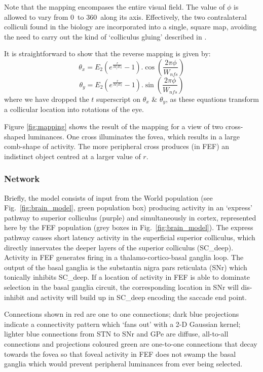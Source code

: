 \documentclass{frontiersSCNS}
\begin{document}
Note that the mapping encompases the entire visual field. The value of
$\phi$ is allowed to vary from 0\dg~to 360\dg~along its axis.
Effectively, the two contralateral colliculi found in the biology are
incorporated into a
single, square map, avoiding the need to carry out the kind of `colliculus
gluing' described in \cite{tabareau_geometry_2007}.

It is straightforward to show that the reverse mapping is given by:
\begin{equation}
   \theta_x = E_2 \left(e^{\frac{r}{M_f E_2}} - 1\right).\cos\left(\frac{2 \pi \phi}{W_{nfs}}\right)
\end{equation}
\begin{equation}
   \theta_y = E_2 \left(e^{\frac{r}{M_f E_2}} - 1\right).\sin\left(\frac{2 \pi \phi}{W_{nfs}}\right)
\end{equation}
where we have dropped the $t$ superscript on $\theta_x$ \& $\theta_y$, as
these equations transform a collicular location into rotations of the eye.

Figure \ref{fig:mapping} shows the result of the mapping for a view of
two cross-shaped luminances. One cross illuminates the fovea, which
results in a large comb-shape of activity. The more peripheral cross
produces (in FEF) an indistinct object centred at a larger value of
$r$.

\subsubsection{Network}

Briefly, the model consists of input from the World population (see
Fig.~\ref{fig:brain_model}, green population box) producing activity
in an `express' pathway to superior colliculus (purple) and
simultaneously in cortex, represented here by the FEF population (grey
boxes in Fig.~\ref{fig:brain_model}). The express pathway causes short
latency activity in the superficial superior colliculus, which
directly innervates the deeper layers of the superior colliculus
(SC\_deep). Activity in FEF generates firing in a
thalamo-cortico-basal ganglia loop. The output of the basal ganglia is
the substantia nigra pars reticulata (SNr) which tonically inhibits
SC\_deep. If a location of activity in FEF is able to dominate
selection in the basal ganglia circuit, the corresponding location in
SNr will dis-inhibit and activity will build up in SC\_deep encoding
the saccade end point.

Connections shown in red are one to one connections; dark blue
projections indicate a connectivity pattern which `fans out' with a
2-D Gaussian kernel; lighter blue connections from STN to SNr and GPe
are diffuse, all-to-all connections and projections coloured green are
one-to-one connections that decay towards the fovea so that foveal
activity in FEF does not swamp the basal ganglia which would prevent
peripheral luminances from ever being selected.
\end{document}
